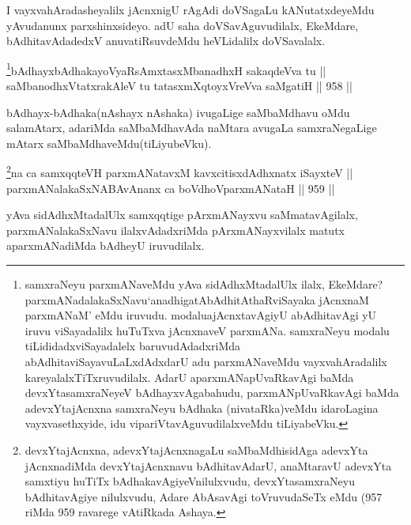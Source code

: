 \begin{artha}
I vayxvahAradasheyalilx jAcnxnigU rAgAdi doVSagaLu kANutatxdeyeMdu yAvudanunx parxshinxsideyo. adU saha doVSavAguvudilalx, EkeMdare, bAdhitavAdadedxV anuvatiRsuvdeMdu heVLidalilx doVSavalalx.
\end{artha}



\begin{shl}
\footnote{samxraNeyu parxmANaveMdu yAva sidAdhxMtadalUlx ilalx, EkeMdare? parxmANadalakaSxNavu\break `anadhigatAbAdhitAthaRviSayaka jAcnxnaM parxmANaM' eMdu iruvudu. modalu\break ajAcnxtavAgiyU abAdhitavAgi yU iruvu viSayadalilx huTuTxva jAcnxnaveV parxmANa. samxraNeyu modalu tiLididadxviSayadalelx baruvudAdadxriMda abAdhitaviSayavuLaLxdAdxdarU adu parxmANaveMdu vayxvahAradalilx kareyalalxTiTxruvudilalx. AdarU aparxmANapUvaRkavAgi baMda devxYtasamxraNeyeV bAdhayxvAgabahudu, parxmANpUvaRkavAgi baMda adevxYtajAcnxna samxraNeyu bAdhaka (nivataRka)veMdu idaroLagina vayxvasethxyide, idu vipariVtavAguvudilalxveMdu tiLiyabeVku.}bAdhayxbAdhakayoVyaRsAmxtasxMbanadhxH sakaqdeVva tu || \\
saMbanodhxVtatxrakAleV tu tatasxmXqtoyxVreVva saMgatiH \hfill || 958 ||  
\end{shl}

\begin{artha}
bAdhayx-bAdhaka(nAshayx nAshaka) ivugaLige saMbaMdhavu oMdu salamAtarx, adariMda saMbaMdhavAda naMtara avugaLa samxraNegaLige mAtarx saMbaMdhaveMdu(tiLiyubeVku).
\end{artha}



\begin{shl}
\footnote{devxYtajAcnxna, adevxYtajAcnxnagaLu saMbaMdhisidAga adevxYta jAcnxnadiMda devxYtajAcnxnavu bAdhitavAdarU, anaMtaravU adevxYta samxtiyu huTiTx bAdhakavAgiyeVnilulxvudu, devxYtasamxraNeyu bAdhitavAgiye nilulxvudu, Adare AbAsavAgi toVruvudaSeTx eMdu (957 riMda 959 ravarege vAtiRkada Ashaya.}na ca samxqqteVH parxmANatavxM kavxcitisxdAdhxnatx iSayxteV ||  \\
parxmANalakaSxNABAvAnanx ca boVdhoV\s parxmANataH \hfill || 959 ||  
\end{shl}

\begin{artha}
yAva sidAdhxMtadalUlx samxqqtige pArxmANayxvu saMmatavAgilalx, parxmANalakaSxNavu ilalxvAdadxriMda pArxmANayxvilalx matutx aparxmANadiMda bAdheyU iruvudilalx.
\end{artha}

